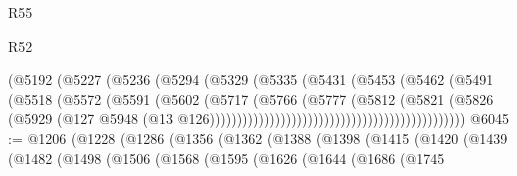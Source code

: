 \begin{lexlean}{R55}
\begin{lexlean}{R52}
\begin{coremodule}
{{{{{{{{{{{{{{{{{{{{{{{{{{{{{{{{{{{{{{{{{{{{{{{{{{{{{{{{{{{{{{{{{{{{{{{{{{{{{{{{{{{{{{{{{{{{{{{{{{{{{{{{{{{{{{{{{{{{{{{{{{{{{{{{{{{{{{{{{{{{{{{{{{{{{{{{{{{{{{{{{{{{{{{{{{{{{{{{{{{{{{{{{{{{{{{{{{{{{{                                                    (@5192
                                                      (@5227
                                                        (@5236
                                                          (@5294
                                                            (@5329
                                                              (@5335
                                                                (@5431
                                                                  (@5453
                                                                    (@5462
                                                                      (@5491
                                                                        (@5518
                                                                          (@5572
                                                                            (@5591
                                                                              (@5602
                                                                                (@5717
                                                                                  (@5766
                                                                                    (@5777
                                                                                      (@5812
                                                                                        (@5821
                                                                                          (@5826
                                                                                            (@5929
                                                                                              (@127
                                                                                                @5948
                                                                                                (@13
                                                                                                  @126)))))))))))))))))))))))))))))))))))))))))))))))
@6045 := @1206
    (@1228
      (@1286
        (@1356
          (@1362
            (@1388
              (@1398
                (@1415
                  (@1420
                    (@1439
                      (@1482
                        (@1498
                          (@1506
                            (@1568
                              (@1595
                                (@1626
                                  (@1644
                                    (@1686
                                      (@1745
}}}}}}}}}}}}}}}}}}}}}}}}}}}}}}}}}}}}}}}}}}}}}}}}}}}}}}}}}}}}}}}}}}}}}}}}}}}}}}}}}}}}}}}}}}}}}}}}}}}}}}}}}}}}}}}}}}}}}}}}}}}}}}}}}}}}}}}}}}}}}}}}}}}}}}}}}}}}}}}}}}}}}}}}}}}}}}}}}}}}}}}}}}}}}}}}}}}}}}
\end{coremodule}
\end{lexlean}
\end{lexlean}
